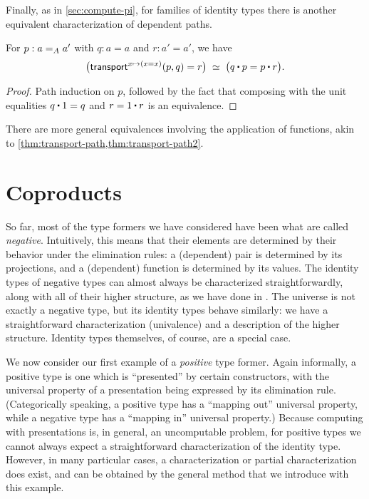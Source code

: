 Finally, as in \autoref{sec:compute-pi}, for families of identity types there is another equivalent characterization of dependent paths.

\begin{thm}\label{thm:dpath-path}
  For $p:\id[A]a{a'}$ with $q:a=a$ and $r:a'=a'$, we have
  \[ \eqvspaced{ \big(\transfib{x\mapsto (x=x)}{p}{q} = r \big) }{ \big( q \ct p = p \ct r \big). } \]
\end{thm}
\begin{proof}
  Path induction on $p$, followed by the fact that composing with the unit equalities $q\ct 1 = q$ and $r = 1\ct r$ is an equivalence.
\end{proof}

There are more general equivalences involving the application of functions, akin to \autoref{thm:transport-path,thm:transport-path2}.

%

\section{Coproducts}
\label{sec:compute-coprod}

%
%
So far, most of the type formers we have considered have been what are called \emph{negative}.
%
%
Intuitively, this means that their elements are determined by their behavior under the elimination rules: a (dependent) pair is determined by its projections, and a (dependent) function is determined by its values.
The identity types of negative types can almost always be characterized straightforwardly, along with all of their higher structure, as we have done in .
The universe is not exactly a negative type, but its identity types behave similarly: we have a straightforward characterization (univalence) and a description of the higher structure.
Identity types themselves, of course, are a special case.

We now consider our first example of a \emph{positive} type former.
%
Again informally, a positive type is one which is ``presented'' by certain constructors, with the universal property of a presentation being expressed by its elimination rule.
(Categorically speaking, a positive type has a ``mapping out'' universal property, while a negative type has a ``mapping in'' universal property.)
Because computing with presentations is, in general, an uncomputable problem, for positive types we cannot always expect a straightforward characterization of the identity type.
However, in many particular cases, a characterization or partial characterization does exist, and can be obtained by the general method that we introduce with this example.

